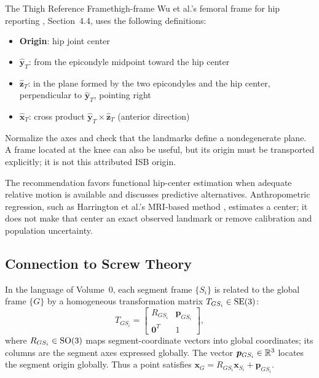 \begin{example}{The Thigh Reference Frame}{thigh-frame}
  Wu et al.'s femoral frame for hip reporting \cite{Wu2002}, Section~4.4,
  uses the following definitions:
  \begin{itemize}
    \item \textbf{Origin}: hip joint center
    \item $\hat{\bm{y}}_T$: from the epicondyle midpoint toward the hip center
    \item $\hat{\bm{z}}_T$: in the plane formed by the two epicondyles
          and the hip center, perpendicular to $\hat{\bm{y}}_T$, pointing right
    \item $\hat{\bm{x}}_T$: cross product $\hat{\bm{y}}_T \times \hat{\bm{z}}_T$
          (anterior direction)
  \end{itemize}
  Normalize the axes and check that the landmarks define a nondegenerate plane.
  A frame located at the knee can also be useful, but its origin must be
  transported explicitly; it is not this attributed ISB origin.

  The recommendation favors functional hip-center estimation when adequate
  relative motion is available and discusses predictive alternatives.
  Anthropometric regression, such as Harrington et al.'s MRI-based method
  \cite{Harrington2007}, estimates a center; it does not make that center an
  exact observed landmark or remove calibration and population uncertainty.
\end{example}

\subsection{Connection to Screw Theory}

In the language of Volume~0, each segment frame $\{S_i\}$ is related to the global
frame $\{G\}$ by a homogeneous transformation matrix $T_{GS_i} \in \mathrm{SE}(3)$:
\begin{equation}
  T_{GS_i} = \begin{bmatrix} R_{GS_i} & \bm{p}_{GS_i} \\ \bm{0}^T & 1 \end{bmatrix},
  \label{eq:ch2:homogeneous}
\end{equation}
where $R_{GS_i} \in \mathrm{SO}(3)$ maps segment-coordinate vectors into global coordinates;
its columns are the segment axes expressed globally. The vector
$\bm{p}_{GS_i} \in \mathbb{R}^3$ locates the segment origin globally. Thus a point
satisfies $\bm{x}_G=R_{GS_i}\bm{x}_{S_i}+\bm{p}_{GS_i}$.

